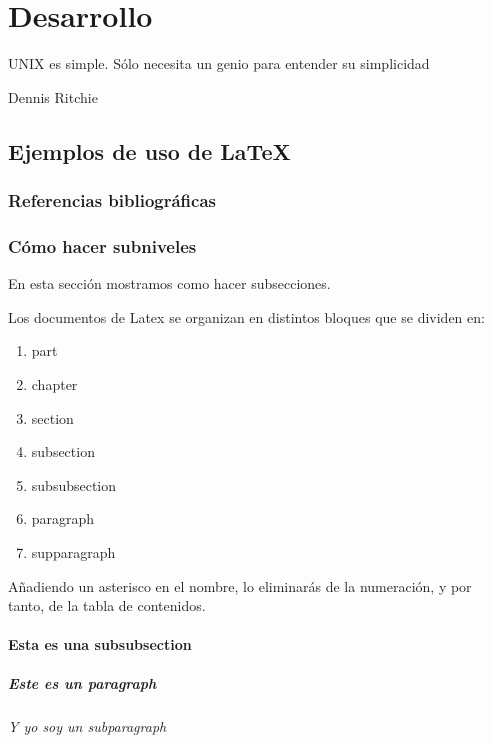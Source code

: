 \chapter{Desarrollo}
\epigraph{UNIX es simple. Sólo necesita un genio para entender su simplicidad}{Dennis Ritchie}

\section{Ejemplos de uso de \LaTeX}

\subsection{Referencias bibliográficas}


\subsection{Cómo hacer subniveles}
En esta sección mostramos como hacer subsecciones.

Los documentos de Latex se organizan en distintos bloques que se dividen en:

\begin{enumerate}
  \item part
  \item chapter
  \item section
  \item subsection
  \item subsubsection
  \item paragraph
  \item supparagraph
\end{enumerate}

Añadiendo un asterisco en el nombre, lo eliminarás de la numeración, y por tanto, de la tabla de contenidos.

\subsubsection{Esta es una subsubsection}
\paragraph{Este es un paragraph}
\subparagraph{Y yo soy un subparagraph}


